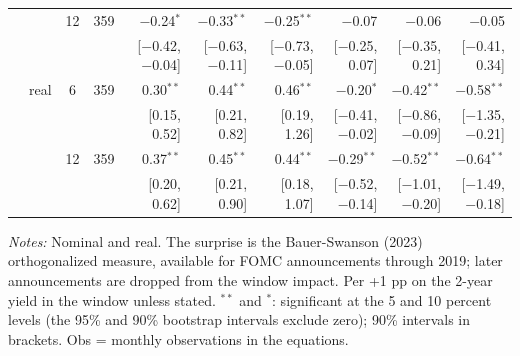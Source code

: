 \begin{longtable}{llcrrrrrrr}
 &  & 12 & 359 & $-$0.24$^{*}$ & $-$0.33$^{**}$ & $-$0.25$^{**}$ & $-$0.07 & $-$0.06 & $-$0.05\\
 & & & & {\scriptsize [$-$0.42, $-$0.04]} & {\scriptsize [$-$0.63, $-$0.11]} & {\scriptsize [$-$0.73, $-$0.05]} & {\scriptsize [$-$0.25, 0.07]} & {\scriptsize [$-$0.35, 0.21]} & {\scriptsize [$-$0.41, 0.34]}\\
 & real & 6 & 359 & 0.30$^{**}$ & 0.44$^{**}$ & 0.46$^{**}$ & $-$0.20$^{*}$ & $-$0.42$^{**}$ & $-$0.58$^{**}$\\
 & & & & {\scriptsize [0.15, 0.52]} & {\scriptsize [0.21, 0.82]} & {\scriptsize [0.19, 1.26]} & {\scriptsize [$-$0.41, $-$0.02]} & {\scriptsize [$-$0.86, $-$0.09]} & {\scriptsize [$-$1.35, $-$0.21]}\\
 &  & 12 & 359 & 0.37$^{**}$ & 0.45$^{**}$ & 0.44$^{**}$ & $-$0.29$^{**}$ & $-$0.52$^{**}$ & $-$0.64$^{**}$\\
 & & & & {\scriptsize [0.20, 0.62]} & {\scriptsize [0.21, 0.90]} & {\scriptsize [0.18, 1.07]} & {\scriptsize [$-$0.52, $-$0.14]} & {\scriptsize [$-$1.01, $-$0.20]} & {\scriptsize [$-$1.49, $-$0.18]}\\
\end{longtable}
\begin{flushleft}\footnotesize\textit{Notes:} Nominal and real. The surprise is the Bauer-Swanson (2023) orthogonalized measure, available for FOMC announcements through 2019; later announcements are dropped from the window impact. Per +1 pp on the 2-year yield in the window unless stated. $^{**}$ and $^{*}$: significant at the 5 and 10 percent levels (the 95\% and 90\% bootstrap intervals exclude zero); 90\% intervals in brackets. Obs = monthly observations in the equations.\end{flushleft}
\endgroup
